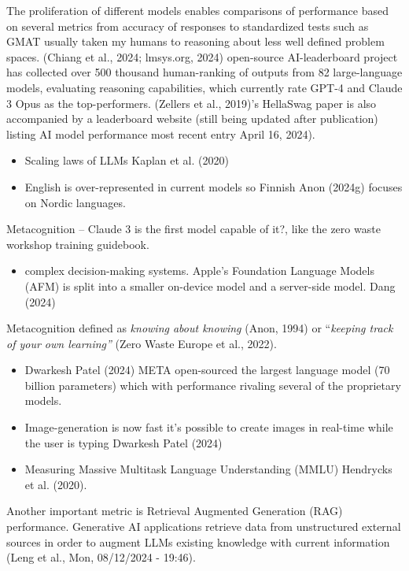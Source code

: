 \documentclass[
  letterpaper,
  DIV=11,
  numbers=noendperiod]{scrartcl}
\providecommand{\tightlist}{%
  \setlength{\itemsep}{0pt}\setlength{\parskip}{0pt}}\usepackage{longtable,booktabs,array}
\begin{document}
The proliferation of different models enables comparisons of performance
based on several metrics from accuracy of responses to standardized
tests such as GMAT usually taken my humans to reasoning about less well
defined problem spaces. (Chiang et al., 2024; lmsys.org, 2024)
open-source AI-leaderboard project has collected over 500 thousand
human-ranking of outputs from 82 large-language models, evaluating
reasoning capabilities, which currently rate GPT-4 and Claude 3 Opus as
the top-performers. (Zellers et al., 2019)'s HellaSwag paper is also
accompanied by a leaderboard website (still being updated after
publication) listing AI model performance most recent entry April 16,
2024).

\begin{itemize}
\item
  Scaling laws of LLMs Kaplan et al. (2020)
\item
  English is over-represented in current models so Finnish Anon (2024g)
  focuses on Nordic languages.
\end{itemize}

Metacognition -- Claude 3 is the first model capable of it?, like the
zero waste workshop training guidebook.

\begin{itemize}
\tightlist
\item
  complex decision-making systems. Apple's Foundation Language Models
  (AFM) is split into a smaller on-device model and a server-side model.
  Dang (2024)
\end{itemize}

Metacognition defined as \emph{knowing about knowing} (Anon, 1994) or
``\emph{keeping track of your own learning''} (Zero Waste Europe et al.,
2022).

\begin{itemize}
\item
  Dwarkesh Patel (2024) META open-sourced the largest language model (70
  billion parameters) which with performance rivaling several of the
  proprietary models.
\item
  Image-generation is now fast it's possible to create images in
  real-time while the user is typing Dwarkesh Patel (2024)
\item
  Measuring Massive Multitask Language Understanding (MMLU) Hendrycks et
  al. (2020).
\end{itemize}

Another important metric is Retrieval Augmented Generation (RAG)
performance. Generative AI applications retrieve data from unstructured
external sources in order to augment LLMs existing knowledge with
current information (Leng et al., Mon, 08/12/2024 - 19:46).
\end{document}
